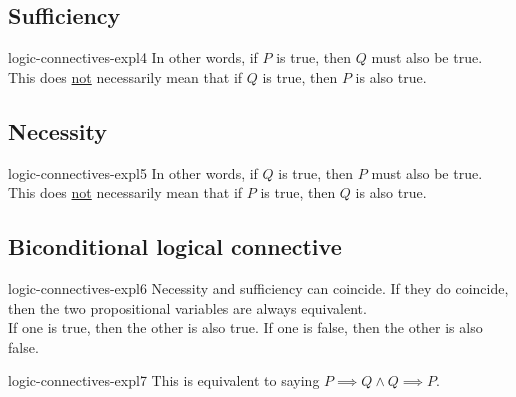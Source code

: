 \documentclass[preview]{standalone}
\begin{document}
\subsection{Sufficiency}


\begin{snippet}{logic-connectives-expl4}
In other words, if \(P\) is true, then \(Q\) must also be true.
This does \underline{not} necessarily mean that if \(Q\) is true, then \(P\) is also true.
\end{snippet}


\subsection{Necessity}


\begin{snippet}{logic-connectives-expl5}
In other words, if \(Q\) is true, then \(P\) must also be true.
This does \underline{not} necessarily mean that if \(P\) is true, then \(Q\) is also true.
\end{snippet}


\subsection{Biconditional logical connective}

\begin{snippet}{logic-connectives-expl6}
Necessity and sufficiency can coincide. If they do coincide,
then the two propositional variables are always equivalent. \\
If one is true, then the other is also true. If one is false, then the other is also false.
\end{snippet}


\begin{snippet}{logic-connectives-expl7}
This is equivalent to saying \(P \implies Q \land Q \implies P\).
\end{snippet}


\end{document}
